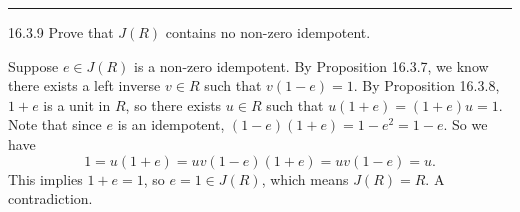 \documentclass[a4paper, 12pt]{article}
\begin{document}
\noindent\rule{7in}{2.8pt}
\begin{problem}{16.3.9}
Prove that \(J(R)\) contains no non-zero idempotent.
\end{problem}
\begin{solution}
Suppose \(e\in J(R)\) is a non-zero idempotent. By Proposition 16.3.7, we know there exists a left inverse \(v\in R\) such that \(v(1-e)=1\). By Proposition 16.3.8, \(1+e\) is a unit in \(R\), so there exists \(u\in R\) such that 
\(u(1+e)=(1+e)u=1\). Note that since \(e\) is an idempotent, \((1-e)(1+e)=1-e^2=1-e\). So we have 
\[1=u(1+e)=uv(1-e)(1+e)=uv(1-e)=u.\]
This implies \(1+e=1\), so \(e=1\in J(R)\), which means \(J(R)=R\). A contradiction.
\end{solution}
\end{document}
